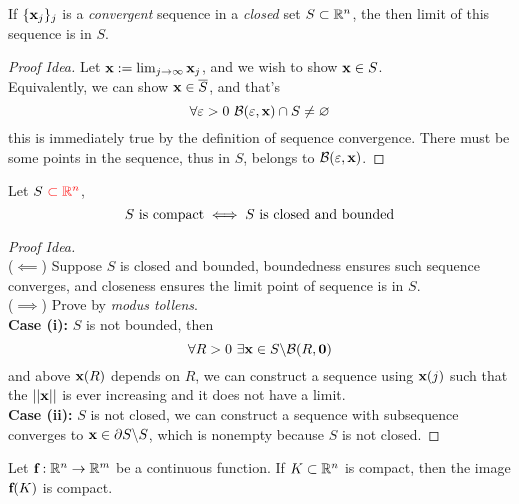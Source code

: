\documentclass[11pt]{article}
\newcommand{\vef}[0]{\ve{f}}
\begin{document}
				\begin{proposition}
					If $\{\textbf{x}_j\}_j$ is a \emph{convergent} sequence in a \emph{closed} set $S \subset \mathbb{R}^n$, the then limit of this sequence is in $S$.
					\begin{proof}[Proof Idea]
						Let $\textbf{x} := \lim_{j \to \infty} \textbf{x}_j$, and we wish to show $\textbf{x} \in S$. \\
						Equivalently, we can show $\textbf{x} \in \overline{S}$, and that's 
						\begin{equation}
							\forall \varepsilon >0\ \mathcal{{B}}(\varepsilon, \textbf{x}) \cap S \neq \varnothing
						\end{equation}
						this is immediately true by the definition of sequence convergence. There must be some points in the sequence, thus in $S$, belongs to $\mathcal{{B}}(\varepsilon, \textbf{x})$.
					\end{proof}
				\end{proposition}
			
				\begin{theorem} Let $S\ \textcolor{red}{\subset \mathbb{R}^n}$,
					\begin{equation}
						S \text{{ is compact}} \iff S \text{{ is closed and bounded}}
					\end{equation}
					\begin{proof}[Proof Idea] \quad \\
						($\impliedby$) Suppose $S$ is closed and bounded, boundedness ensures such sequence converges, and closeness ensures the limit point of sequence is in $S$. \\
						($\implies$) Prove by \emph{modus tollens}. \\
						\textbf{Case (i): }$S$ is not bounded, then
						\begin{equation}
							\forall R > 0\ \exists \vex \in S \backslash \mc{B}(R,\ve{0})
						\end{equation}
						and above $\textbf{x}(R)$ depends on $R$, we can construct a sequence using $\textbf{x}(j)$ such that the $\vert \vert {\textbf{x}} \vert \vert$ is ever increasing and it does not have a limit. \\
						\textbf{Case (ii):} $S$ is not closed, we can construct a sequence with subsequence converges to $\textbf{x} \in \partial S \backslash S$, which is nonempty because $S$ is not closed.
					\end{proof}
				\end{theorem}
				
				\begin{theorem}
					Let $\vef: \R^n \to \R^m$ be a continuous function. If $K \subset \mathbb{R}^n$ is compact, then the image $\vef(K)$ is compact.
				\end{theorem}
			
\end{document}
